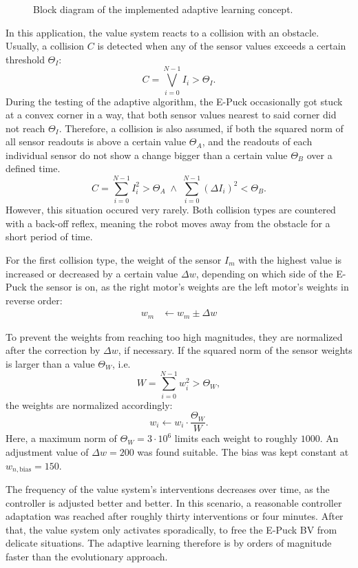 \documentclass[a4paper]{jacow}
\begin{document}
\begin{figure}[tbp]
	\centering
	
	\caption{Block diagram of the implemented adaptive learning concept.}
	\label{fig:adaptivelearningsketch}
\end{figure}

In this application, the value system reacts to a collision with an obstacle. Usually, a collision $C$ is detected when any of the sensor values exceeds a certain threshold $\Theta_I$:
\begin{equation}
	C = \bigvee\limits_{i=0}^{N-1} I_i > \Theta_I. 
\end{equation}
During the testing of the adaptive algorithm, the E-Puck occasionally got stuck at a convex corner in a way, that both sensor values nearest to said corner did not reach $\Theta_I$. Therefore, a collision is also assumed, if both the squared norm of all sensor readouts is above a certain value $\Theta_A$, and the readouts of each individual sensor do not show a change bigger than a certain value $\Theta_B$ over a defined time.
\begin{equation}
	C = \sum\limits_{i=0}^{N-1} I_i^2 > \Theta_A \;\wedge\; \sum\limits_{i=0}^{N-1} (\Delta I_i)^2 < \Theta_B.
\end{equation}
However, this situation occured very rarely. 
Both collision types are countered with a back-off reflex, meaning the robot moves away from the obstacle for a short period of time.

For the first collision type, the weight of the sensor $I_m$ with the highest value is increased or decreased by a certain value $\Delta w$, depending on which side of the E-Puck the sensor is on, as the right motor's weights are the left motor's weights in reverse order:
\begin{align}
	w_m &\leftarrow w_m \pm \Delta w\label{eq:weightcorrection}
\end{align}

To prevent the weights from reaching too high magnitudes, they are normalized after the correction by $\Delta w$, if necessary. If the squared norm of the sensor weights is larger than a value $\Theta_W$, i.e.
\begin{equation}
	W = \sum\limits_{i=0}^{N-1} w_i^2 > \Theta_W,
\end{equation}
the weights are normalized accordingly:
\begin{equation}
	w_i \leftarrow w_i \cdot \frac{\Theta_W}{W}.
\end{equation}
Here, a maximum norm of $\Theta_W=3\cdot 10^6$ limits each weight to roughly $1000$. An adjustment value of $\Delta w = 200$ was found suitable. The bias was kept constant at $w_{n,\text{bias}} = 150$.

The frequency of the value system's interventions decreases over time, as the controller is adjusted better and better. In this scenario, a reasonable controller adaptation was reached after roughly thirty interventions or four minutes. After that, the value system only activates sporadically, to free the E-Puck BV from delicate situations. The adaptive learning therefore is by orders of magnitude faster than the evolutionary approach.
\end{document}
